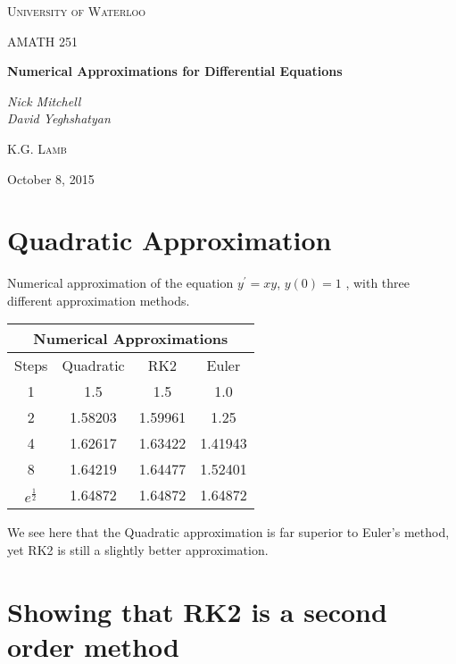 \documentclass[12pt]{article}
\begin{document}
	
	
	\begin{titlepage}
        \centering
		{\scshape\LARGE University of Waterloo \par}
		\vspace{1cm}
		{\scshape\Large AMATH 251\par}
		\vspace{1.5cm}
		{\huge\bfseries Numerical Approximations for Differential Equations \par}
		\vspace{2cm}
		{\Large\itshape Nick Mitchell\\David Yeghshatyan\par}
		\vfill
		\par
		\textsc{K.G. Lamb}
		\vfill
		{\large October 8, 2015 \par}
	\end{titlepage}
	
	\section{Quadratic Approximation}

	\hspace{5mm} Numerical approximation of the equation $y^{\prime}=xy$, $y(0)=1$ , with three different approximation methods.
	
	\begin{center}
		\begin{tabular}{ |c||c|c|c| } 
			\hline
			\multicolumn{4}{|c|}{\textbf{Numerical Approximations}} \\
			\hline
			\hline
			Steps & Quadratic & RK2 & Euler \\
			\hline
			1 & 1.5 & 1.5 & 1.0\\ 
			\hline
			2 & 1.58203 & 1.59961 & 1.25\\ 
			\hline
			4 & 1.62617 & 1.63422 & 1.41943\\ 
			\hline
			8 & 1.64219 & 1.64477 & 1.52401\\ 
			\hline
			\hline
			$e^{\frac{1}{2}}$ & 1.64872 & 1.64872 & 1.64872\\ 
			\hline
		\end{tabular}
	\end{center}
	
	We see here that the Quadratic approximation is far superior to Euler's method, yet RK2 is still a slightly better approximation.
	
	\section{Showing that RK2 is a second order method}
	
\end{document}
